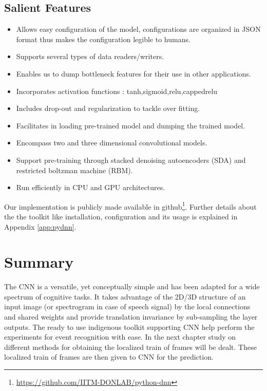 \subsection{Salient Features}
\begin{itemize}
	\item Allows easy configuration of the model, configurations are organized in JSON format thus makes the configuration legible to humans.
	\item Supports several types of data readers/writers. 
	\item Enables us to dump bottleneck features for their use in other applications.
	\item Incorporates activation functions : tanh,sigmoid,relu,cappedrelu
	\item Includes drop-out and regularization to tackle over fitting.
	\item Facilitates in loading pre-trained model and dumping the trained model.
	\item Encompass two and three dimensional convolutional models.
	\item Support pre-training through stacked denoising autoencoders (SDA) and restricted boltzman machine (RBM).
	\item Run efficiently in CPU and GPU architectures.	
\end{itemize}
Our implementation is publicly made available in github\footnote{\url{https://github.com/IITM-DONLAB/python-dnn}}. Further details about the the toolkit like installation, configuration and its usage is explained in Appendix \ref{app:pydnn}.

\section{Summary}
The CNN is a versatile, yet conceptually simple and has been adapted for a wide spectrum of cognitive tasks. It takes advantage of the 2D/3D structure of an input image (or spectrogram in case of speech signal) by the local connections and shared weights and provide translation invariance by sub-sampling the layer outputs. The ready to use indigenous toolkit supporting CNN help perform the experiments for event recognition with ease. In the next chapter study on different methods for obtaining the localized train of frames will be dealt. These localized train of frames are then given to CNN for the prediction.